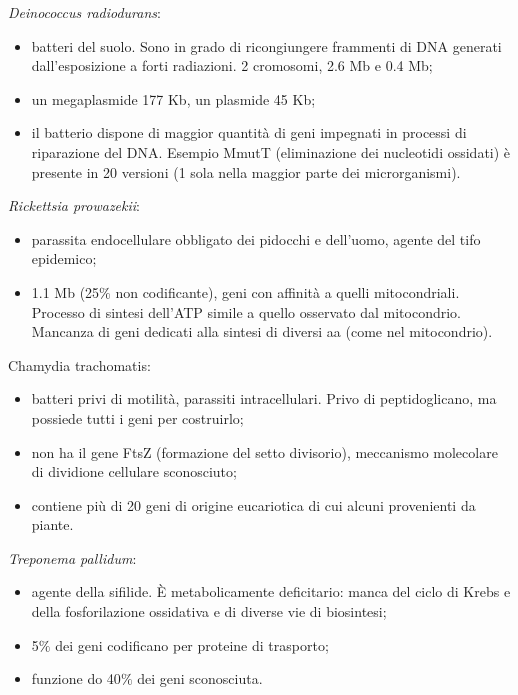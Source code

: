 \begin{multicols}{2}
\begin{itemize}
\end{itemize}
\textit{Deinococcus radiodurans}:
\begin{itemize}
    \item batteri del suolo. 
Sono in grado di ricongiungere frammenti di DNA generati dall'esposizione a forti radiazioni. 
2 cromosomi, 2.6
 Mb e 0.4
 Mb;
    \item un megaplasmide 177 Kb, un plasmide 45 Kb;
    \item il batterio dispone di maggior quantit\`a di geni impegnati in processi di riparazione del DNA. 
Esempio MmutT (eliminazione dei nucleotidi ossidati) \`e presente in 20 versioni (1 sola nella maggior parte dei microrganismi).
\end{itemize}
\textit{Rickettsia prowazekii}:
\begin{itemize}
    \item parassita endocellulare obbligato dei pidocchi e dell'uomo, agente del tifo epidemico; \item 1.1
 Mb (25$\%$ non codificante), geni con affinit\`a a quelli mitocondriali. 
Processo di sintesi dell'ATP simile a quello osservato dal mitocondrio. 
Mancanza di geni dedicati alla sintesi di diversi aa (come nel mitocondrio).
\end{itemize}
\textit{}{Chamydia trachomatis}:
\begin{itemize}
    \item batteri privi di motilit\`a, parassiti intracellulari. 
Privo di peptidoglicano, ma possiede tutti i geni per costruirlo;
    \item non ha il gene FtsZ (formazione del setto divisorio), meccanismo molecolare di dividione cellulare sconosciuto;
    \item contiene pi\`u di 20 geni di origine eucariotica di cui alcuni provenienti da piante.
\end{itemize}
\textit{Treponema pallidum}:
\begin{itemize}
    \item agente della sifilide. 
\`E metabolicamente deficitario: manca del ciclo di Krebs e della fosforilazione ossidativa e di diverse vie di biosintesi; 
    \item 5$\%$ dei geni codificano per proteine di trasporto; 
    \item funzione do 40$\%$ dei geni sconosciuta. 


\end{itemize}
\end{multicols}
